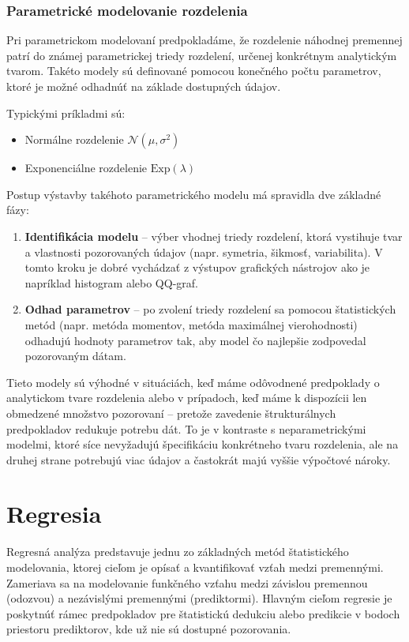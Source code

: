 \subsubsection{Parametrické modelovanie rozdelenia}

Pri parametrickom modelovaní predpokladáme, že rozdelenie náhodnej premennej patrí do známej parametrickej triedy rozdelení, určenej konkrétnym analytickým tvarom. Takéto modely sú definované pomocou konečného počtu parametrov, ktoré je možné odhadnúť na základe dostupných údajov.

Typickými príkladmi sú:
\begin{itemize}
  \item Normálne rozdelenie $\mathcal{N}(\mu, \sigma^2)$
  \item Exponenciálne rozdelenie $\text{Exp}(\lambda)$
\end{itemize}

Postup výstavby takéhoto parametrického modelu má spravidla dve základné fázy:
\begin{enumerate}
  \item \textbf{Identifikácia modelu} – výber vhodnej triedy rozdelení, ktorá vystihuje tvar a vlastnosti pozorovaných údajov (napr. symetria, šikmosť, variabilita). V tomto kroku je dobré vychádzať z výstupov grafických nástrojov ako je napríklad histogram alebo QQ-graf.
  
  \item \textbf{Odhad parametrov} – po zvolení triedy rozdelení sa pomocou štatistických metód (napr. metóda momentov, metóda maximálnej vierohodnosti) odhadujú hodnoty parametrov tak, aby model čo najlepšie zodpovedal pozorovaným dátam.
\end{enumerate}

Tieto modely sú výhodné v situáciách, keď máme odôvodnené predpoklady o analytickom tvare rozdelenia alebo v prípadoch, keď máme k dispozícii len obmedzené množstvo pozorovaní – pretože zavedenie štrukturálnych predpokladov redukuje potrebu dát. To je v kontraste s neparametrickými modelmi, ktoré síce nevyžadujú špecifikáciu konkrétneho tvaru rozdelenia, ale na druhej strane potrebujú viac údajov a častokrát majú vyššie výpočtové nároky.

\section{Regresia}\label{sec:regresia}

Regresná analýza predstavuje jednu zo základných metód štatistického modelovania, ktorej cieľom je opísať a kvantifikovať vzťah medzi premennými. Zameriava sa na modelovanie funkčného vzťahu medzi závislou premennou (odozvou) a nezávislými premennými (prediktormi). Hlavným cieľom regresie je poskytnúť rámec predpokladov pre štatistickú dedukciu alebo  predikcie v bodoch priestoru prediktorov, kde už nie sú dostupné pozorovania.

